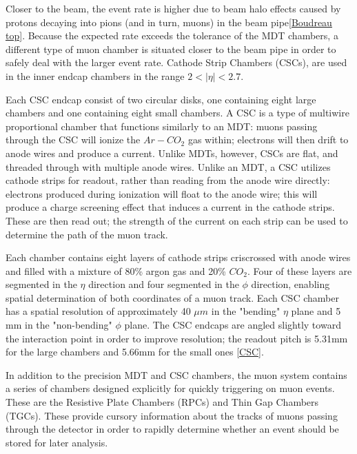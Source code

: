 Closer to the beam, the event rate is higher due to beam halo effects caused by protons decaying into pions (and in turn, muons) in the beam pipe\ref{Boudreau top}. Because the expected rate exceeds the tolerance of the MDT chambers, a different type of muon chamber is situated closer to the beam pipe in order to safely deal with the larger event rate. Cathode Strip Chambers (CSCs), are used in the inner endcap chambers in the range $ 2 < | \eta | < 2.7 $.

Each CSC endcap consist of two circular disks, one containing eight large chambers and one containing eight small chambers. A CSC is a type of multiwire proportional chamber that functions similarly to an MDT: muons passing through the CSC will ionize the $Ar-CO_2$ gas within; electrons will then drift to anode wires and produce a current. Unlike MDTs, however, CSCs are flat, and threaded through with multiple anode wires. Unlike an MDT, a CSC utilizes cathode strips for readout, rather than reading from the anode wire directly: electrons produced during ionization will float to the anode wire; this will produce a charge screening effect that induces a current in the cathode strips. These are then read out; the strength of the current on each strip can be used to determine the path of the muon track.

Each chamber contains eight layers of cathode strips criscrossed with anode wires and filled with a mixture of 80\% argon gas and 20\% $CO_2$. Four of these layers are segmented in the $\eta$ direction and four segmented in the $\phi$ direction, enabling spatial determination of both coordinates of a muon track. Each CSC chamber has a spatial resolution of approximately 40 $\mu m$ in the "bending" $\eta$ plane and 5 mm in the "non-bending" $\phi$ plane. The CSC endcaps are angled slightly toward the interaction point in order to improve resolution; the readout pitch is 5.31mm for the large chambers and 5.66mm for the small ones \ref{CSC}.

In addition to the precision MDT and CSC chambers, the muon system contains a series of chambers designed explicitly for quickly triggering on muon events. These are the Resistive Plate Chambers (RPCs) and Thin Gap Chambers (TGCs). These provide cursory information about the tracks of muons passing through the detector in order to rapidly determine whether an event should be stored for later analysis.


